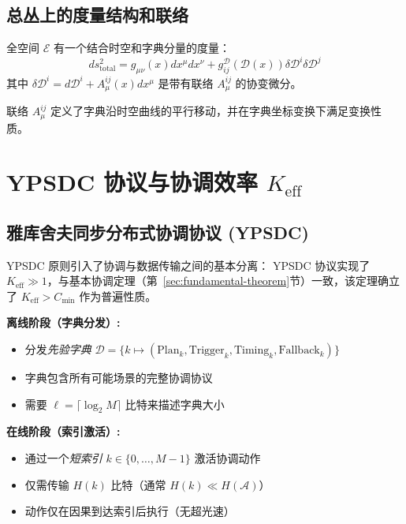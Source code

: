 \documentclass[11pt,a4paper]{article}
\begin{document}
	\subsection{总丛上的度量结构和联络}
	全空间 $\mathcal{E}$ 有一个结合时空和字典分量的度量：
	\begin{equation}
		ds^2_{\text{total}} = g_{\mu\nu}(x) dx^\mu dx^\nu + g_{ij}^{\mathcal{D}}(\mathcal{D}(x)) \delta\mathcal{D}^i \delta\mathcal{D}^j
	\end{equation}
	其中 $\delta\mathcal{D}^i = d\mathcal{D}^i + A_\mu^{ij}(x) dx^\mu$ 是带有联络 $A_\mu^{ij}$ 的协变微分。
	
	联络 $A_\mu^{ij}$ 定义了字典沿时空曲线的平行移动，并在字典坐标变换下满足变换性质。
	
	\section{YPSDC 协议与协调效率 \texorpdfstring{$K_{\mathrm{eff}}$}{K_eff}}
	
	\subsection{雅库舍夫同步分布式协调协议 (YPSDC)}
	YPSDC 原则引入了协调与数据传输之间的基本分离：
	YPSDC 协议实现了 $K_{\mathrm{eff}} \gg 1$，与基本协调定理（第~\ref{sec:fundamental-theorem}节）一致，该定理确立了 $K_{\mathrm{eff}} > C_{\min}$ 作为普遍性质。
	\begin{tcolorbox}[title=YPSDC 原则, colback=blue!5!white, colframe=blue!50!black]
		\textbf{离线阶段（字典分发）:}
		\begin{itemize}
			\item 分发\textit{先验字典} $\mathcal{D} = \{k \mapsto (\text{Plan}_k, \text{Trigger}_k, \text{Timing}_k, \text{Fallback}_k)\}$
			\item 字典包含所有可能场景的完整协调协议
			\item 需要 $\ell = \lceil \log_2 M \rceil$ 比特来描述字典大小
		\end{itemize}
		
		\textbf{在线阶段（索引激活）:}
		\begin{itemize}
			\item 通过一个\textit{短索引} $k \in \{0, \dots, M-1\}$ 激活协调动作
			\item 仅需传输 $H(k)$ 比特（通常 $H(k) \ll H(\mathcal{A})$）
			\item 动作仅在因果到达索引后执行（无超光速）
		\end{itemize}
	\end{tcolorbox}
	
\end{document}
